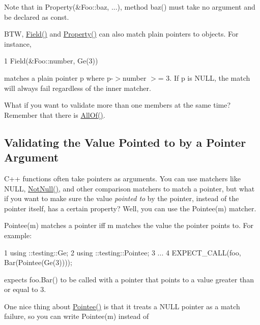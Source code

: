 Note that in {\ttfamily Property(\&Foo\+::baz, ...)}, method {\ttfamily baz()} must take no argument and be declared as {\ttfamily const}.

B\+TW, {\ttfamily \hyperlink{namespacetesting_a4df3849391696aa93ac3a7703a717c2a}{Field()}} and {\ttfamily \hyperlink{namespacetesting_a0fad10571e23f7bc0d5c83d4c31ba740}{Property()}} can also match plain pointers to objects. For instance,


\begin{DoxyCode}
1 Field(&Foo::number, Ge(3))
\end{DoxyCode}


matches a plain pointer {\ttfamily p} where {\ttfamily p-\/$>$number $>$= 3}. If {\ttfamily p} is {\ttfamily N\+U\+LL}, the match will always fail regardless of the inner matcher.

What if you want to validate more than one members at the same time? Remember that there is {\ttfamily \hyperlink{namespacetesting_af7618e8606c1cb45738163688944e2b7}{All\+Of()}}.

\subsection*{Validating the Value Pointed to by a Pointer Argument}

C++ functions often take pointers as arguments. You can use matchers like {\ttfamily N\+U\+LL}, {\ttfamily \hyperlink{namespacetesting_a39d1f92b53b8b2a0b6db6a22ac146416}{Not\+Null()}}, and other comparison matchers to match a pointer, but what if you want to make sure the value {\itshape pointed to} by the pointer, instead of the pointer itself, has a certain property? Well, you can use the {\ttfamily Pointee(m)} matcher.

{\ttfamily Pointee(m)} matches a pointer iff {\ttfamily m} matches the value the pointer points to. For example\+:


\begin{DoxyCode}
1 using ::testing::Ge;
2 using ::testing::Pointee;
3 ...
4   EXPECT\_CALL(foo, Bar(Pointee(Ge(3))));
\end{DoxyCode}


expects {\ttfamily foo.\+Bar()} to be called with a pointer that points to a value greater than or equal to 3.

One nice thing about {\ttfamily \hyperlink{namespacetesting_a5122ca3533f3a00f67e146dd81f3b68c}{Pointee()}} is that it treats a {\ttfamily N\+U\+LL} pointer as a match failure, so you can write {\ttfamily Pointee(m)} instead of



